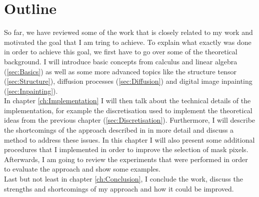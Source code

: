 \section{Outline}
So far, we have reviewed some of the work that is closely related to my work and 
motivated the goal that I am tring to achieve.
To explain what exactly was done in order to achieve this goal, we first have to go over some of the
theoretical background. I will introduce basic concepts from
calculus and linear algebra (\ref{sec:Basics}) as well as some more advanced topics
like the structure tensor (\ref{sec:Structure}), diffusion processes (\ref{sec:Diffusion}) and
digital image inpainting (\ref{sec:Inpainting}).\\
In chapter \ref{ch:Implementation} I will then talk about the technical details of the  
implementation, for example the discretisation used to implement the theoretical ideas from 
the previous chapter (\ref{sec:Discretisation}). 
Furthermore, I will describe the shortcomings of the approach described in \cite{zimmer07} in more
detail and discuss a method to address these issues. In this chapter I will also present some
additional procedures that I implemented in order to improve the selection of mask pixels. \\
Afterwards, I am going to review the experiments that were performed in order to evaluate the
approach and show some examples.\\
Last but not least in chapter \ref{ch:Conclusion}, I conclude the work, discuss the strengths
and shortcomings of my approach and how it could be improved.
